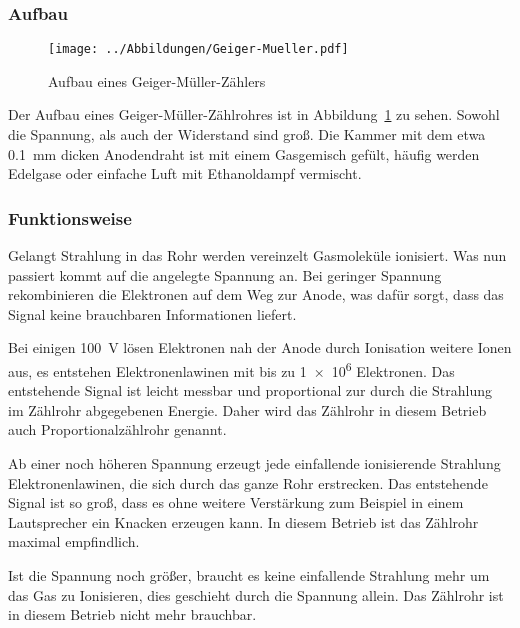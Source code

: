 \parencite[Abschnitt~9.3.2]{meschede-gerthsen_24}

\parencite[Abschnitt~19.3.2~d)]{meschede-gerthsen_24}

\FloatBarrier
\subsubsection{Aufbau}

\begin{figure}[htpb]
    \centering
    \texttt{[image: ../Abbildungen/Geiger-Mueller.pdf]}
    \caption{%
        Aufbau eines Geiger-Müller-Zählers
    }
    \label{fig:geiger}
\end{figure}

Der Aufbau eines Geiger-Müller-Zählrohres ist in Abbildung~\ref{fig:geiger} 
zu sehen. Sowohl die Spannung, als auch der Widerstand sind groß. Die 
Kammer mit dem etwa \SI{0.1}{\milli\meter} dicken Anodendraht ist mit einem 
Gasgemisch gefült, häufig werden Edelgase oder einfache Luft mit 
Ethanoldampf vermischt.

\FloatBarrier
\subsubsection{Funktionsweise}

Gelangt Strahlung in das Rohr werden vereinzelt Gasmoleküle ionisiert. Was
nun passiert kommt auf die angelegte Spannung an. Bei geringer Spannung
rekombinieren die Elektronen auf dem Weg zur Anode, was dafür sorgt, dass das
Signal keine brauchbaren Informationen liefert.

Bei einigen \SI{100}{\volt} lösen Elektronen nah der Anode durch Ionisation
weitere Ionen aus, es entstehen Elektronenlawinen mit bis zu \num{1e6}
Elektronen. Das entstehende Signal ist leicht messbar und proportional zur
durch die Strahlung im Zählrohr abgegebenen Energie. Daher wird das
Zählrohr in diesem Betrieb auch Proportionalzählrohr genannt.

Ab einer noch höheren Spannung erzeugt jede einfallende ionisierende
Strahlung Elektronenlawinen, die sich durch das ganze Rohr erstrecken. Das
entstehende Signal ist so groß, dass es ohne weitere Verstärkung zum
Beispiel in einem Lautsprecher ein Knacken erzeugen kann. In diesem Betrieb ist
das Zählrohr maximal empfindlich.

Ist die Spannung noch größer, braucht es keine einfallende Strahlung mehr um
das Gas zu Ionisieren, dies geschieht durch die Spannung allein. Das
Zählrohr ist in diesem Betrieb nicht mehr brauchbar.

